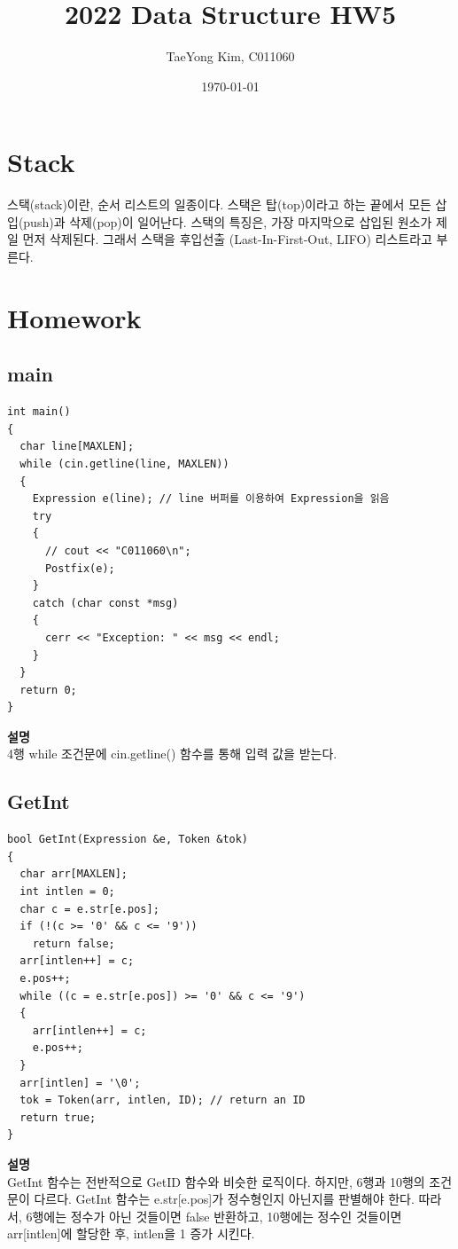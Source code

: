 \documentclass{article}
\title{2022 Data Structure HW5}
\author{TaeYong Kim, C011060}
\date{\today}
\begin{document}
\maketitle

\section{Stack}
스택(stack)이란, 순서 리스트의 일종이다. 스택은 탑(top)이라고 하는 끝에서 모든 삽입(push)과 삭제(pop)이 일어난다. 스택의 특징은, 가장 마지막으로 삽입된 원소가 제일 먼저 삭제된다. 그래서 스택을 후입선출 (Last-In-First-Out, LIFO) 리스트라고 부른다.

\section{Homework}

\subsection{main}

\begin{verbatim}
int main()
{
  char line[MAXLEN];
  while (cin.getline(line, MAXLEN))
  {
    Expression e(line); // line 버퍼를 이용하여 Expression을 읽음
    try
    {
      // cout << "C011060\n";
      Postfix(e);
    }
    catch (char const *msg)
    {
      cerr << "Exception: " << msg << endl;
    }
  }
  return 0;
}
\end{verbatim}

\noindent \textbf{설명} \\
4행 while 조건문에 cin.getline() 함수를 통해 입력 값을 받는다. 


\subsection{GetInt}

\begin{verbatim}
bool GetInt(Expression &e, Token &tok)
{
  char arr[MAXLEN];
  int intlen = 0;
  char c = e.str[e.pos];
  if (!(c >= '0' && c <= '9'))
    return false;
  arr[intlen++] = c;
  e.pos++;
  while ((c = e.str[e.pos]) >= '0' && c <= '9')
  {
    arr[intlen++] = c;
    e.pos++;
  }
  arr[intlen] = '\0';
  tok = Token(arr, intlen, ID); // return an ID
  return true;
}
\end{verbatim}

\noindent \textbf{설명} \\
GetInt 함수는 전반적으로 GetID 함수와 비슷한 로직이다.
하지만, 6행과 10행의 조건문이 다르다.
GetInt 함수는 e.str[e.pos]가 정수형인지 아닌지를 판별해야 한다.
따라서, 6행에는 정수가 아닌 것들이면 false 반환하고, 10행에는 정수인 것들이면 arr[intlen]에 할당한 후, intlen을 1 증가 시킨다.
\end{document}
